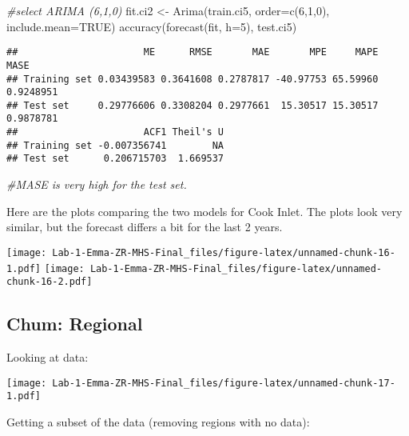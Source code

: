 \documentclass[
]{article}
\newenvironment{Shaded}{\begin{snugshade}}{\end{snugshade}}
\newcommand{\AttributeTok}[1]{\textcolor[rgb]{0.77,0.63,0.00}{#1}}
\newcommand{\CommentTok}[1]{\textcolor[rgb]{0.56,0.35,0.01}{\textit{#1}}}
\newcommand{\ConstantTok}[1]{\textcolor[rgb]{0.00,0.00,0.00}{#1}}
\newcommand{\DecValTok}[1]{\textcolor[rgb]{0.00,0.00,0.81}{#1}}
\newcommand{\FunctionTok}[1]{\textcolor[rgb]{0.00,0.00,0.00}{#1}}
\newcommand{\NormalTok}[1]{#1}
\newcommand{\OtherTok}[1]{\textcolor[rgb]{0.56,0.35,0.01}{#1}}
\begin{document}
\begin{Shaded}
\begin{Highlighting}[]
\CommentTok{\#select ARIMA (6,1,0)}
\NormalTok{fit.ci2 }\OtherTok{\textless{}{-}} \FunctionTok{Arima}\NormalTok{(train.ci5, }\AttributeTok{order=}\FunctionTok{c}\NormalTok{(}\DecValTok{6}\NormalTok{,}\DecValTok{1}\NormalTok{,}\DecValTok{0}\NormalTok{), }\AttributeTok{include.mean=}\ConstantTok{TRUE}\NormalTok{)}
\FunctionTok{accuracy}\NormalTok{(}\FunctionTok{forecast}\NormalTok{(fit, }\AttributeTok{h=}\DecValTok{5}\NormalTok{), test.ci5)}
\end{Highlighting}
\end{Shaded}

\begin{verbatim}
##                      ME      RMSE       MAE       MPE     MAPE      MASE
## Training set 0.03439583 0.3641608 0.2787817 -40.97753 65.59960 0.9248951
## Test set     0.29776606 0.3308204 0.2977661  15.30517 15.30517 0.9878781
##                      ACF1 Theil's U
## Training set -0.007356741        NA
## Test set      0.206715703  1.669537
\end{verbatim}

\begin{Shaded}
\begin{Highlighting}[]
\CommentTok{\#MASE is very high for the test set.}
\end{Highlighting}
\end{Shaded}

Here are the plots comparing the two models for Cook Inlet. The plots
look very similar, but the forecast differs a bit for the last 2 years.

\texttt{[image: Lab-1-Emma-ZR-MHS-Final\_files/figure-latex/unnamed-chunk-16-1.pdf]}
\texttt{[image: Lab-1-Emma-ZR-MHS-Final\_files/figure-latex/unnamed-chunk-16-2.pdf]}

\hypertarget{chum-regional}{%
\subsection{Chum: Regional}\label{chum-regional}}

Looking at data:

\texttt{[image: Lab-1-Emma-ZR-MHS-Final\_files/figure-latex/unnamed-chunk-17-1.pdf]}

Getting a subset of the data (removing regions with no data):
\end{document}
